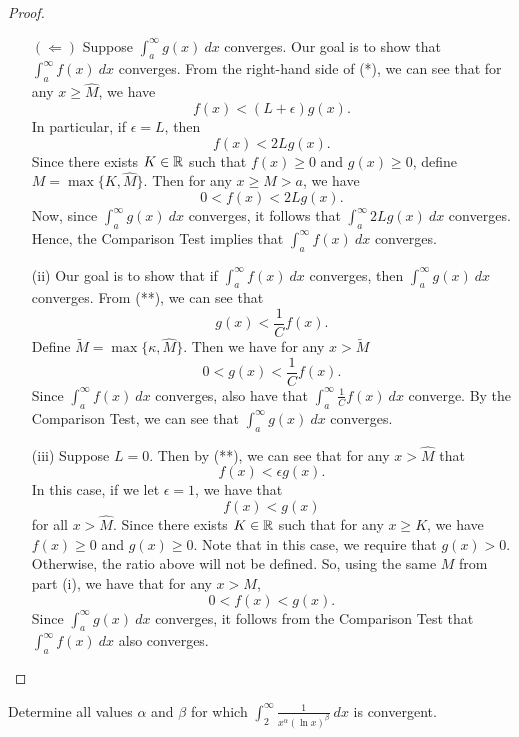 \documentclass[a4paper]{article}
\begin{document}
\begin{proof}
\begin{enumerate}
           \( (\Longleftarrow) \) Suppose \( \int_{ a }^{ \infty  } g(x) \ dx  \) converges. Our goal is to show that \( \int_{ a }^{ \infty  } f(x) \ dx  \) converges. From the right-hand side of (*), we can see that for any \( x \geq \hat{M} \), we have 
           \[  f(x) < (L+\epsilon) g(x). \]
           In particular, if \( \epsilon = L \), then 
           \[  f(x) < 2 L g(x). \]
           Since there exists \( K \in \mathbb{R}  \) such that \( f(x) \geq 0  \) and \( g(x) \geq 0 \), define \( M = \max \{ K, \hat{M} \}  \). Then for any \( x \geq M > a   \), we have  
    \[  0 < f(x) < 2L g(x). \]
    Now, since \( \int_{ a }^{ \infty  } g(x) \ dx  \) converges, it follows that \( \int_{ a }^{ \infty  } 2L g(x) \ dx  \) converges. Hence, the Comparison Test implies that \( \int_{ a }^{ \infty  } f(x) \ dx  \) converges.
    \item[(ii)] Our goal is to show that if \( \int_{ a }^{ \infty  }  f(x) \ dx  \) converges, then \( \int_{ a }^{ \infty  } g(x) \ dx  \) converges. From (**), we can see that     
        \[  g(x) < \frac{ 1 }{ C }  f(x).  \]
        Define \( \tilde{M} = \max \{ \kappa, \hat{M} \}  \). Then we have for any \( x > \tilde{M} \)
        \[  0 < g(x) < \frac{ 1 }{ C  }  f(x). \]
    Since \( \int_{ a }^{ \infty  } f(x) \ dx  \) converges, also have that \( \int_{ a }^{ \infty  } \frac{ 1 }{ C } f(x) \ dx  \) converge. By the Comparison Test, we can see that \( \int_{ a }^{ \infty  } g(x) \ dx  \) converges.
\item[(iii)] Suppose \( L = 0   \). Then by (**), we can see that for any \( x > \hat{M} \) that 
    \[  f(x) < \epsilon g(x). \]
    In this case, if we let \( \epsilon = 1  \), we have that 
    \[  f(x) < g(x) \] for all \( x > \hat{M} \). Since there exists \( K \in \mathbb{R}   \) such that for any \( x \geq K  \), we have \( f(x) \geq 0  \) and \( g(x) \geq 0 \). Note that in this case, we require that \( g(x) > 0  \). Otherwise, the ratio above will not be defined. So, using the same \(  M   \) from part (i), we have that for any \(x > M  \),  
    \[  0 < f(x) < g(x).  \]
    Since \( \int_{ a }^{ \infty  } g(x) \ dx  \) converges, it follows from the Comparison Test that \( \int_{ a }^{ \infty  } f(x) \ dx  \) also converges.
    \end{enumerate}
\end{proof}

\begin{problem}
    Determine all values \( \alpha  \) and \( \beta  \) for which \( \int_{ 2 }^{ \infty  }  \frac{ 1 }{ x^{\alpha} (\ln x)^{\beta} }  \ dx \) is convergent.
\end{problem}
\end{document}
